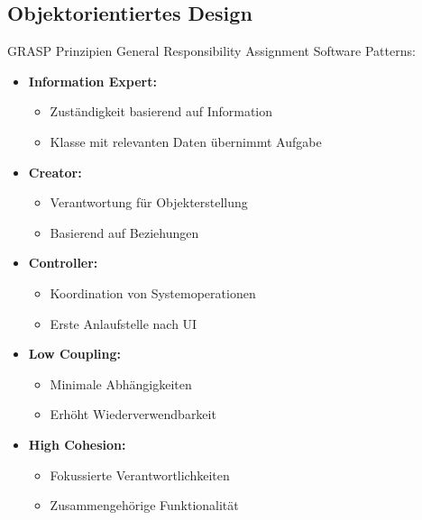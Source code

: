 
\subsection{Objektorientiertes Design}

\begin{concept}{GRASP Prinzipien}
General Responsibility Assignment Software Patterns:

\begin{itemize}
    \item \textbf{Information Expert:} 
    \begin{itemize}
        \item Zuständigkeit basierend auf Information
        \item Klasse mit relevanten Daten übernimmt Aufgabe
    \end{itemize}
    
    \item \textbf{Creator:} 
    \begin{itemize}
        \item Verantwortung für Objekterstellung
        \item Basierend auf Beziehungen
    \end{itemize}
    
    \item \textbf{Controller:} 
    \begin{itemize}
        \item Koordination von Systemoperationen
        \item Erste Anlaufstelle nach UI
    \end{itemize}
    
    \item \textbf{Low Coupling:} 
    \begin{itemize}
        \item Minimale Abhängigkeiten
        \item Erhöht Wiederverwendbarkeit
    \end{itemize}
    
    \item \textbf{High Cohesion:} 
    \begin{itemize}
        \item Fokussierte Verantwortlichkeiten
        \item Zusammengehörige Funktionalität
    \end{itemize}
\end{itemize}
\end{concept}

